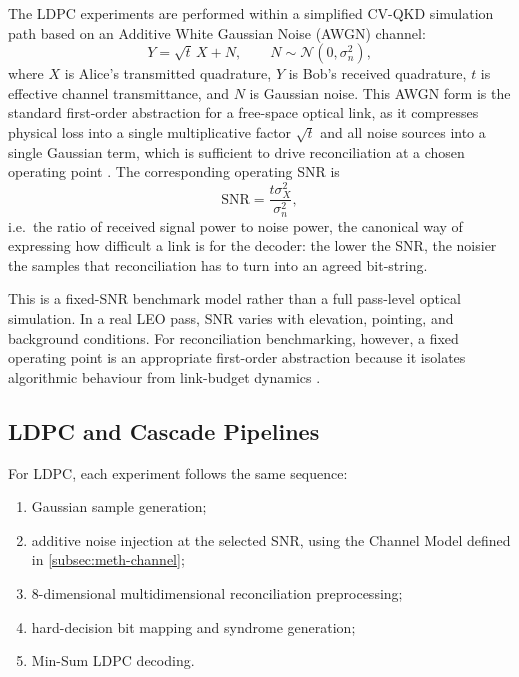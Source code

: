 \documentclass{UoYCSproject}
\begin{document}
The LDPC experiments are performed within a simplified CV-QKD simulation path
based on an Additive White Gaussian Noise (AWGN) channel:
\begin{equation}
Y = \sqrt{t}\,X + N, \qquad N \sim \mathcal{N}(0,\sigma_n^2),
\end{equation}
where $X$ is Alice's transmitted quadrature, $Y$ is Bob's received quadrature,
$t$ is effective channel transmittance, and $N$ is Gaussian noise. This AWGN
form is the standard first-order abstraction for a free-space optical link, as it
compresses physical loss into a single multiplicative factor $\sqrt{t}$ and all
noise sources into a single Gaussian term, which is sufficient to drive
reconciliation at a chosen operating point \cite{e25091286}. The corresponding operating SNR is
\begin{equation}
\text{SNR} = \frac{t \sigma_X^2}{\sigma_n^2},
\end{equation}
i.e.\ the ratio of received signal power to noise power, the canonical way
of expressing how difficult a link is for the decoder: the lower the SNR,
the noisier the samples that reconciliation has to turn into an agreed
bit-string.

This is a fixed-SNR benchmark model rather than a full pass-level optical
simulation. In a real LEO pass, SNR varies with elevation, pointing, and
background conditions. For reconciliation benchmarking, however, a fixed
operating point is an appropriate first-order abstraction because it isolates
algorithmic behaviour from link-budget dynamics
\cite{milicevic_quasi-cyclic_2018, jordan-parra_evaluation_2024}.

\subsection{LDPC and Cascade Pipelines}
\label{subsec:meth-pipelines}

For LDPC, each experiment follows the same sequence:
\begin{enumerate}
    \item Gaussian sample generation;
    \item additive noise injection at the selected SNR, using the Channel Model defined in \ref{subsec:meth-channel};
    \item 8-dimensional multidimensional reconciliation preprocessing;
    \item hard-decision bit mapping and syndrome generation;
    \item Min-Sum LDPC decoding.
\end{enumerate}
\end{document}
